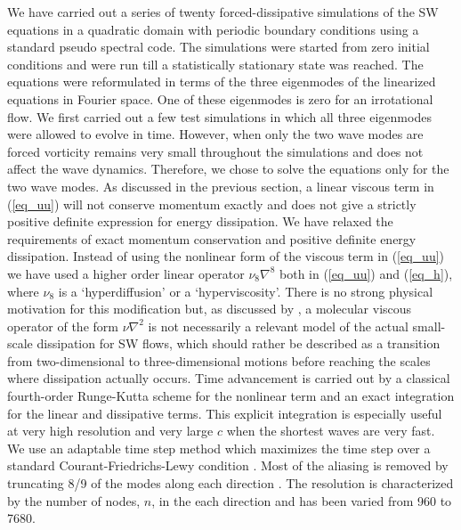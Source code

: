 We have carried out a series of twenty forced-dissipative simulations of the SW equations in a quadratic domain with periodic boundary conditions using a standard pseudo spectral code. The simulations were started from zero initial conditions and were run till a statistically stationary state was reached. The equations 
were reformulated in terms of  the three eigenmodes of the linearized equations in Fourier space. One of these eigenmodes is zero for an irrotational flow.  
We first carried out a few test simulations in which all three eigenmodes were allowed to evolve in time. However, when only the two wave modes are forced vorticity remains very small throughout the simulations and does not affect the wave dynamics. Therefore, we chose to solve the equations only for the two wave modes. As discussed in the previous section,  a linear viscous term in (\ref{eq_uu}) 
will not conserve momentum exactly and does not give a strictly positive definite expression for energy dissipation. We have relaxed the requirements of exact momentum conservation and positive definite energy dissipation. 
Instead of  using the nonlinear form of the viscous term in (\ref{eq_uu}) we have used a higher order linear operator  $ \nu_8 \nabla^{8} $ both in (\ref{eq_uu}) and
(\ref{eq_h}), where $ \nu_8 $ is a `hyperdiffusion' or a `hyperviscosity'. There is no strong physical motivation for this
modification but, as discussed by \cite{FargeSadourny1989}, a molecular viscous operator 
 of the form $\nu \nabla^2 $ is not necessarily a
relevant model of the actual small-scale dissipation for SW
flows, which should rather be described as a transition from
two-dimensional to three-dimensional motions before reaching the
scales where dissipation actually occurs.
%
Time advancement is carried out by a classical fourth-order
Runge-Kutta scheme for the nonlinear term and an exact integration for
the linear and dissipative terms.  This explicit integration is
especially useful at very high resolution and very large $c$ when
the shortest waves are very fast. 
We use an adaptable time step method which maximizes the time step
over a standard Courant-Friedrichs-Lewy condition
\cite[]{Lundbladh1999, AugierChomazBillant2012}.
%
Most of the aliasing is removed by truncating 8/9 of the modes along
each direction \cite[for a detail discussion on the issues of the
non-conservation of the non-quadratic energy and the aliasing errors
in the truncated one-layer shallow water model,
see][]{FargeSadourny1989}. The resolution is characterized by the number of nodes, $n$, in the each
direction and has been varied from 960 to 7680.
